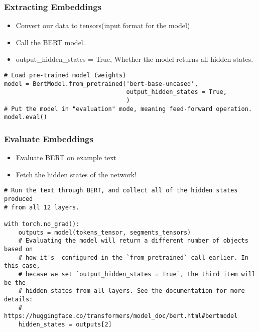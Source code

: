 \begin{frame}[fragile]\frametitle{Extracting Embeddings}
\begin{itemize}
\item Convert our data to tensors(input format for the model)
\item Call the BERT model.
\item output\_hidden\_states = True, Whether the model returns all hidden-states.
\end{itemize}


\begin{lstlisting}
# Load pre-trained model (weights)
model = BertModel.from_pretrained('bert-base-uncased',
                                  output_hidden_states = True, 
                                  )
# Put the model in "evaluation" mode, meaning feed-forward operation.
model.eval()
\end{lstlisting}

\end{frame}

\begin{frame}[fragile]\frametitle{Evaluate Embeddings}
\begin{itemize}
\item Evaluate BERT on example text
\item Fetch the hidden states of the network!
\end{itemize}


\begin{lstlisting}
# Run the text through BERT, and collect all of the hidden states produced
# from all 12 layers. 

with torch.no_grad():
    outputs = model(tokens_tensor, segments_tensors)
    # Evaluating the model will return a different number of objects based on 
    # how it's  configured in the `from_pretrained` call earlier. In this case, 
    # becase we set `output_hidden_states = True`, the third item will be the 
    # hidden states from all layers. See the documentation for more details:
    # https://huggingface.co/transformers/model_doc/bert.html#bertmodel
    hidden_states = outputs[2]
\end{lstlisting}

\end{frame}

